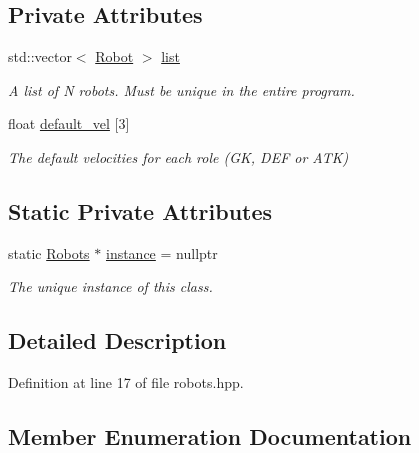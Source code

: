 \subsection*{Private Attributes}
\begin{DoxyCompactItemize}
\item 
std\+::vector$<$ \hyperlink{struct_robots_1_1_robot}{Robot} $>$ \hyperlink{class_robots_a2c6b77265028f82a4342ca1ef15ed305}{list}
\begin{DoxyCompactList}\small\item\em A list of N robots. Must be unique in the entire program. \end{DoxyCompactList}\item 
float \hyperlink{class_robots_a6c03d49137645a67d5c5e39bb953a788}{default\+\_\+vel} \mbox{[}3\mbox{]}
\begin{DoxyCompactList}\small\item\em The default velocities for each role (GK, D\+EF or A\+TK) \end{DoxyCompactList}\end{DoxyCompactItemize}
\subsection*{Static Private Attributes}
\begin{DoxyCompactItemize}
\item 
static \hyperlink{class_robots}{Robots} $\ast$ \hyperlink{class_robots_acd8ab9afe75178be7d696cf2c1b96056}{instance} = nullptr
\begin{DoxyCompactList}\small\item\em The unique instance of this class. \end{DoxyCompactList}\end{DoxyCompactItemize}


\subsection{Detailed Description}


Definition at line 17 of file robots.\+hpp.



\subsection{Member Enumeration Documentation}
\mbox{\label{class_robots_adcc7ae7fbb9bdc57a26ee70fa1ae88e5}} 
